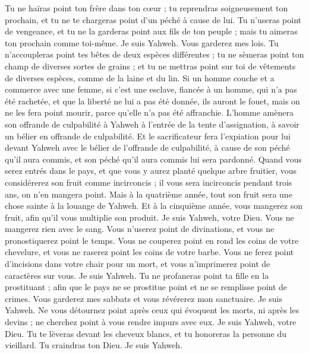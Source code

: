 \begin{multicols}{2}
Tu ne haïras point ton frère dans ton cœur ; tu reprendras soigneusement ton prochain, et tu ne te chargeras point d’un péché à cause de lui.
Tu n'useras point de vengeance, et tu ne la garderas point aux fils de ton peuple ; mais tu aimeras ton prochain comme toi-même. Je suis Yahweh.
Vous garderez mes lois. Tu n'accoupleras point tes bêtes de deux espèces différentes ; tu ne sèmeras point ton champ de diverses sortes de grains ; et tu ne mettras point sur toi de vêtements de diverses espèces, comme de la laine et du lin.
Si un homme couche et a commerce avec une femme, si c’est une esclave, fiancée à un homme, qui n’a pas été rachetée, et que la liberté ne lui a pas été donnée, ils auront le fouet, mais on ne les fera point mourir, parce qu'elle n'a pas été affranchie.
L'homme amènera son offrande de culpabilité à Yahweh à l'entrée de la tente d'assignation, à savoir un bélier en offrande de culpabilité.
Et le sacrificateur fera l’expiation pour lui devant Yahweh avec le bélier de l'offrande de culpabilité, à cause de son péché qu'il aura commis, et son péché qu'il aura commis lui sera pardonné.
Quand vous serez entrés dans le pays, et que vous y aurez planté quelque arbre fruitier, vous considérerez son fruit comme incirconcis ; il vous sera incirconcis pendant trois ans, on n'en mangera point.
Mais à la quatrième année, tout son fruit sera une chose sainte à la louange de Yahweh.
Et à la cinquième année, vous mangerez son fruit, afin qu'il vous multiplie son produit. Je suis Yahweh, votre Dieu.
Vous ne mangerez rien avec le sang. Vous n'userez point de divinations, et vous ne pronostiquerez point le temps.
Vous ne couperez point en rond les coins de votre chevelure, et vous ne raserez point les coins de votre barbe.
Vous ne ferez point d'incisions dans votre chair pour un mort, et vous n'imprimerez point de caractères sur vous. Je suis Yahweh.
Tu ne profaneras point ta fille en la prostituant ; afin que le pays ne se prostitue point et ne se remplisse point de crimes.
Vous garderez mes sabbats et vous révérerez mon sanctuaire. Je suis Yahweh.
Ne vous détournez point après ceux qui évoquent les morts, ni après les devins ; ne cherchez point à vous rendre impurs avec eux. Je suis Yahweh, votre Dieu.
Tu te lèveras devant les cheveux blancs, et tu honoreras la personne du vieillard. Tu craindras ton Dieu. Je suis Yahweh.

\end{multicols}
